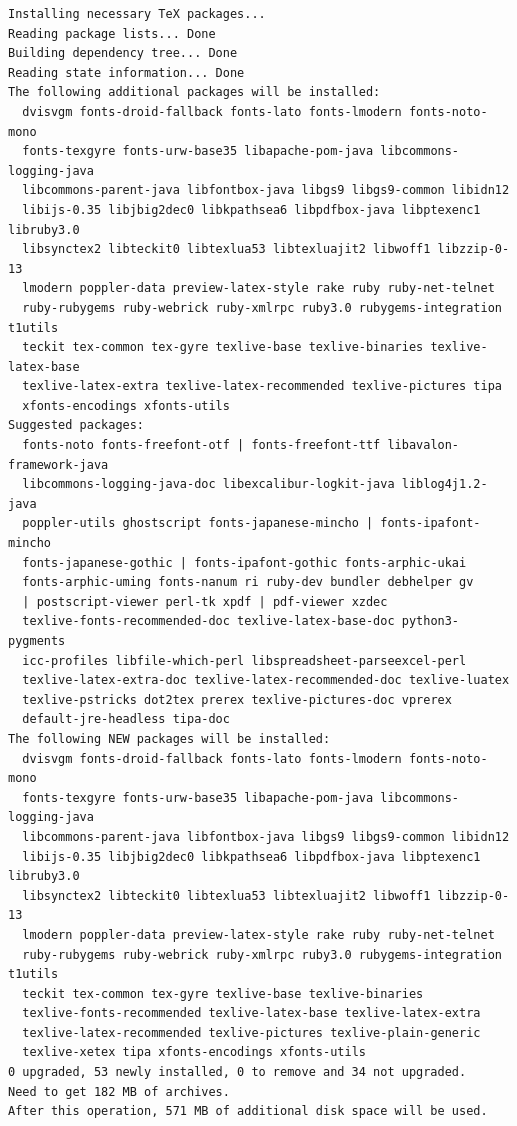 \documentclass[
  11pt,
  letterpaper,
]{book}
\begin{document}
\begin{verbatim}
Installing necessary TeX packages...
Reading package lists... Done
Building dependency tree... Done
Reading state information... Done
The following additional packages will be installed:
  dvisvgm fonts-droid-fallback fonts-lato fonts-lmodern fonts-noto-mono
  fonts-texgyre fonts-urw-base35 libapache-pom-java libcommons-logging-java
  libcommons-parent-java libfontbox-java libgs9 libgs9-common libidn12
  libijs-0.35 libjbig2dec0 libkpathsea6 libpdfbox-java libptexenc1 libruby3.0
  libsynctex2 libteckit0 libtexlua53 libtexluajit2 libwoff1 libzzip-0-13
  lmodern poppler-data preview-latex-style rake ruby ruby-net-telnet
  ruby-rubygems ruby-webrick ruby-xmlrpc ruby3.0 rubygems-integration t1utils
  teckit tex-common tex-gyre texlive-base texlive-binaries texlive-latex-base
  texlive-latex-extra texlive-latex-recommended texlive-pictures tipa
  xfonts-encodings xfonts-utils
Suggested packages:
  fonts-noto fonts-freefont-otf | fonts-freefont-ttf libavalon-framework-java
  libcommons-logging-java-doc libexcalibur-logkit-java liblog4j1.2-java
  poppler-utils ghostscript fonts-japanese-mincho | fonts-ipafont-mincho
  fonts-japanese-gothic | fonts-ipafont-gothic fonts-arphic-ukai
  fonts-arphic-uming fonts-nanum ri ruby-dev bundler debhelper gv
  | postscript-viewer perl-tk xpdf | pdf-viewer xzdec
  texlive-fonts-recommended-doc texlive-latex-base-doc python3-pygments
  icc-profiles libfile-which-perl libspreadsheet-parseexcel-perl
  texlive-latex-extra-doc texlive-latex-recommended-doc texlive-luatex
  texlive-pstricks dot2tex prerex texlive-pictures-doc vprerex
  default-jre-headless tipa-doc
The following NEW packages will be installed:
  dvisvgm fonts-droid-fallback fonts-lato fonts-lmodern fonts-noto-mono
  fonts-texgyre fonts-urw-base35 libapache-pom-java libcommons-logging-java
  libcommons-parent-java libfontbox-java libgs9 libgs9-common libidn12
  libijs-0.35 libjbig2dec0 libkpathsea6 libpdfbox-java libptexenc1 libruby3.0
  libsynctex2 libteckit0 libtexlua53 libtexluajit2 libwoff1 libzzip-0-13
  lmodern poppler-data preview-latex-style rake ruby ruby-net-telnet
  ruby-rubygems ruby-webrick ruby-xmlrpc ruby3.0 rubygems-integration t1utils
  teckit tex-common tex-gyre texlive-base texlive-binaries
  texlive-fonts-recommended texlive-latex-base texlive-latex-extra
  texlive-latex-recommended texlive-pictures texlive-plain-generic
  texlive-xetex tipa xfonts-encodings xfonts-utils
0 upgraded, 53 newly installed, 0 to remove and 34 not upgraded.
Need to get 182 MB of archives.
After this operation, 571 MB of additional disk space will be used.

\end{verbatim}
\end{document}

